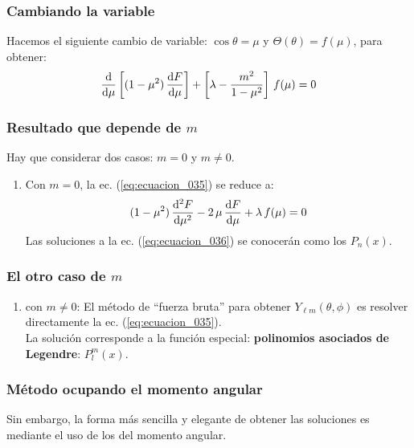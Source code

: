 \documentclass[12pt]{beamer}
\begin{document}
\begin{frame}
\frametitle{Cambiando la variable}
Hacemos el siguiente cambio de variable: $\cos \theta = \mu$ y $\Theta(\theta) = f (\mu)$, para obtener:
\pause
\begin{align}
\dv{\mu} \left[ (1 - \mu^{2}) \, \dv{F}{\mu} \right] + \left[ \lambda - \dfrac{m^{2}}{1 - \mu^{2}} \right] \, f (\mu) = 0
\label{eq:ecuacion_035}
\end{align}
\end{frame}
\begin{frame}
\frametitle{Resultado que depende de $m$}
Hay que considerar dos casos: $m = 0$ y $m \neq 0$.
\pause
{}
\begin{enumerate}[<+->]
\item Con $m = 0$, la ec. (\ref{eq:ecuacion_035}) se reduce a:
\pause
\begin{align}
(1 - \mu^{2}) \, \dv[2]{F}{\mu} - 2  \, \mu \, \dv{F}{\mu} + \lambda \, f (\mu) = 0
\label{eq:ecuacion_036}
\end{align}
\pause
Las soluciones a la ec. (\ref{eq:ecuacion_036}) se conocerán como los  $P_{n} (x)$.
\seti
\end{enumerate}
\end{frame}
\begin{frame}
\frametitle{El otro caso de $m$}
\begin{enumerate}[<+->]
\conti
\item con $m \neq 0$: \pause El método de \enquote{fuerza bruta} para obtener $Y_{\ell m} (\theta, \phi)$ es resolver directamente la ec. (\ref{eq:ecuacion_035}).
\\
\bigskip
\pause
La solución corresponde a la función especial: \textbf{\textcolor{carmine}{polinomios asociados de Legendre}}: $P_{l}^{m} (x)$.
\end{enumerate}
\end{frame}
\begin{frame}
\frametitle{Método ocupando el momento angular}
Sin embargo, \pause la forma más sencilla y elegante de obtener las soluciones es mediante el uso de los  del momento angular.
\end{frame}
\end{document}
